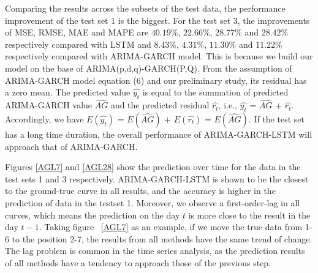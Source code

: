 Comparing the results across the subsets of the test data, the performance improvement of the test set 1 is the biggest.   For the test set 3, the improvements of MSE, RMSE, MAE and MAPE are $40.19\%$, $22.66\%$, $28.77\%$ and $28.42\%$ respectively compared with LSTM and $8.43\%$, $4.31\%$, $11.30\%$ and $11.22\%$ respectively compared with ARIMA-GARCH model. This is because we build our model on the base of  ARIMA(p,d,q)-GARCH(P,Q). From the assumption of ARIMA-GARCH model  equation (6) and our preliminary study, its residual has a zero mean. The predicted value  $\hat{y_t}$ is equal to the summation of predicted ARIMA-GARCH value $\hat{AG}$ and the predicted residual $\hat{r_t}$, i.e., $\hat{y_t}$ = $\hat{AG}$ + $\hat{r_t}$. 
Accordingly, we have $E(\hat{y_t})$ = $E(\hat{AG})$ + $E(\hat{r_t})$ = $E(\hat{AG})$. If the test set has a long time duration, the overall performance of ARIMA-GARCH-LSTM will approach that of ARIMA-GARCH.%



Figures \ref{AGL7} and \ref{AGL28}  show the prediction over time for the data in the test sets 1 and  3 respectively. 
ARIMA-GARCH-LSTM is shown to be the closest to the ground-true curve in all results, and the accuracy is higher in the prediction of data in the testset 1.
Moreover, we observe a first-order-lag in all curves, which means the prediction on the day $t$ is more close to the result in the day $t-1$. Taking figure ~\ref{AGL7} as an example, if we move the true data from 1-6 to the position 2-7, the results from all methods have the same trend of change. The lag problem is  common  in the time series analysis, as the prediction results of all methods have a tendency to approach those of the previous step.  




